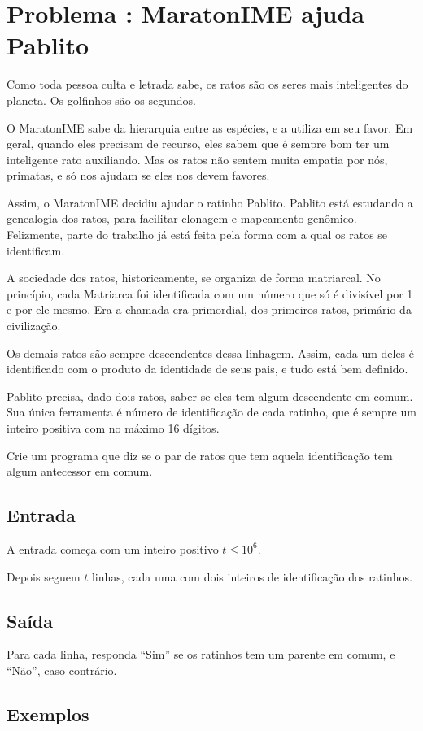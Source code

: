 \section*{Problema \proxLetra: MaratonIME ajuda Pablito}

Como toda pessoa culta e letrada sabe, os ratos são os seres mais inteligentes
do planeta. Os golfinhos são os segundos.

O MaratonIME sabe da hierarquia entre as espécies, e a utiliza em seu favor.
Em geral, quando eles precisam de recurso, eles sabem que é sempre bom ter um
inteligente rato auxiliando. Mas os ratos não sentem muita empatia por nós,
primatas, e só nos ajudam se eles nos devem favores.

Assim, o MaratonIME decidiu ajudar o ratinho Pablito. Pablito está estudando a
genealogia dos ratos, para facilitar clonagem e mapeamento genômico. Felizmente,
parte do trabalho já está feita pela forma com a qual os ratos se identificam.

A sociedade dos ratos, historicamente, se organiza de forma matriarcal. No princípio,
cada Matriarca foi identificada com um número que só é divisível por 1 e por ele mesmo.
Era a chamada era primordial, dos primeiros ratos, primário da civilização.

Os demais ratos são sempre descendentes dessa linhagem. Assim, cada um deles é
identificado com o produto da identidade de seus pais, e tudo está bem definido.

Pablito precisa, dado dois ratos, saber se eles tem algum descendente em comum.
Sua única ferramenta é número de identificação de cada ratinho, que é sempre um
inteiro positiva com no máximo 16 dígitos.

Crie um programa que diz se o par de ratos que tem aquela identificação tem algum
antecessor em comum.

\subsection*{Entrada}
\textoDiversasInstanciasEOF

A entrada começa com um inteiro positivo $t \leq 10^6$.

Depois seguem $t$ linhas, cada uma com dois inteiros de identificação dos ratinhos.
\subsection*{Saída}

Para cada linha, responda ``Sim'' se os ratinhos tem um parente em comum,
e ``Não'', caso contrário.


\subsection*{Exemplos}

